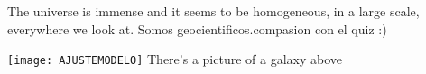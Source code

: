 \documentclass{article}
\begin{document}
The universe is immense and it seems to be homogeneous, 
in a large scale, everywhere we look at.
Somos geocientificos.compasion con el quiz :)
 
\texttt{[image: AJUSTEMODELO]}
\centering
There's a picture of a galaxy above
\end{document}
